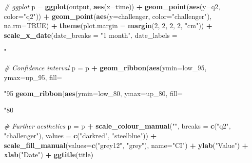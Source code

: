 \documentclass[
  11pt,
]{article}
\newenvironment{Shaded}{\begin{snugshade}}{\end{snugshade}}
\newcommand{\CommentTok}[1]{\textcolor[rgb]{0.56,0.35,0.01}{\textit{#1}}}
\newcommand{\DataTypeTok}[1]{\textcolor[rgb]{0.13,0.29,0.53}{#1}}
\newcommand{\DecValTok}[1]{\textcolor[rgb]{0.00,0.00,0.81}{#1}}
\newcommand{\FloatTok}[1]{\textcolor[rgb]{0.00,0.00,0.81}{#1}}
\newcommand{\KeywordTok}[1]{\textcolor[rgb]{0.13,0.29,0.53}{\textbf{#1}}}
\newcommand{\NormalTok}[1]{#1}
\newcommand{\OperatorTok}[1]{\textcolor[rgb]{0.81,0.36,0.00}{\textbf{#1}}}
\newcommand{\OtherTok}[1]{\textcolor[rgb]{0.56,0.35,0.01}{#1}}
\newcommand{\StringTok}[1]{\textcolor[rgb]{0.31,0.60,0.02}{#1}}
\begin{document}
\begin{Shaded}
\begin{Highlighting}[]
{{{{{  \CommentTok{# ggplot}
\NormalTok{  p =}\StringTok{ }\KeywordTok{ggplot}\NormalTok{(output, }\KeywordTok{aes}\NormalTok{(}\DataTypeTok{x=}\NormalTok{time)) }\OperatorTok{+}
\StringTok{    }\KeywordTok{geom_point}\NormalTok{(}\KeywordTok{aes}\NormalTok{(}\DataTypeTok{y=}\NormalTok{q2, }\DataTypeTok{color=}\StringTok{"q2"}\NormalTok{)) }\OperatorTok{+}
\StringTok{    }\KeywordTok{geom_point}\NormalTok{(}\KeywordTok{aes}\NormalTok{(}\DataTypeTok{y=}\NormalTok{challenger, }\DataTypeTok{color=}\StringTok{"challenger"}\NormalTok{), }\DataTypeTok{na.rm=}\OtherTok{TRUE}\NormalTok{) }\OperatorTok{+}
\StringTok{    }\KeywordTok{theme}\NormalTok{(}\DataTypeTok{plot.margin =} \KeywordTok{margin}\NormalTok{(}\DecValTok{2}\NormalTok{, }\DecValTok{2}\NormalTok{, }\DecValTok{2}\NormalTok{, }\DecValTok{2}\NormalTok{, }\StringTok{"cm"}\NormalTok{)) }\OperatorTok{+}\StringTok{ }\KeywordTok{scale_x_date}\NormalTok{(}\DataTypeTok{date_breaks =} \StringTok{"1 month"}\NormalTok{,}
                                                                 \DataTypeTok{date_labels =} \StringTok{"%

  \CommentTok{# Confidence interval }
\NormalTok{  p =}\StringTok{ }\NormalTok{p }\OperatorTok{+}
\StringTok{    }\KeywordTok{geom_ribbon}\NormalTok{(}\KeywordTok{aes}\NormalTok{(}\DataTypeTok{ymin=}\NormalTok{low_}\DecValTok{95}\NormalTok{, }\DataTypeTok{ymax=}\NormalTok{up_}\DecValTok{95}\NormalTok{, }\DataTypeTok{fill=}\StringTok{"95%
\StringTok{    }\KeywordTok{geom_ribbon}\NormalTok{(}\KeywordTok{aes}\NormalTok{(}\DataTypeTok{ymin=}\NormalTok{low_}\DecValTok{80}\NormalTok{, }\DataTypeTok{ymax=}\NormalTok{up_}\DecValTok{80}\NormalTok{, }\DataTypeTok{fill=}\StringTok{"80%
  
  \CommentTok{# Further aesthetics}
\NormalTok{  p =}\StringTok{ }\NormalTok{p }\OperatorTok{+}
\StringTok{    }\KeywordTok{scale_colour_manual}\NormalTok{(}\StringTok{""}\NormalTok{, }
                        \DataTypeTok{breaks =} \KeywordTok{c}\NormalTok{(}\StringTok{"q2"}\NormalTok{, }\StringTok{"challenger"}\NormalTok{),}
                        \DataTypeTok{values =} \KeywordTok{c}\NormalTok{(}\StringTok{"darkred"}\NormalTok{, }\StringTok{"steelblue"}\NormalTok{)) }\OperatorTok{+}\StringTok{ }
\StringTok{    }\KeywordTok{scale_fill_manual}\NormalTok{(}\DataTypeTok{values=}\KeywordTok{c}\NormalTok{(}\StringTok{"grey12"}\NormalTok{, }\StringTok{"grey"}\NormalTok{), }\DataTypeTok{name=}\StringTok{"CI"}\NormalTok{) }\OperatorTok{+}\StringTok{ }
\StringTok{    }\KeywordTok{ylab}\NormalTok{(}\StringTok{"Value"}\NormalTok{) }\OperatorTok{+}\StringTok{ }\KeywordTok{xlab}\NormalTok{(}\StringTok{"Date"}\NormalTok{) }\OperatorTok{+}\StringTok{ }\KeywordTok{ggtitle}\NormalTok{(title)}
  
}}}}}}}}
\end{Highlighting}
\end{Shaded}
\end{document}
